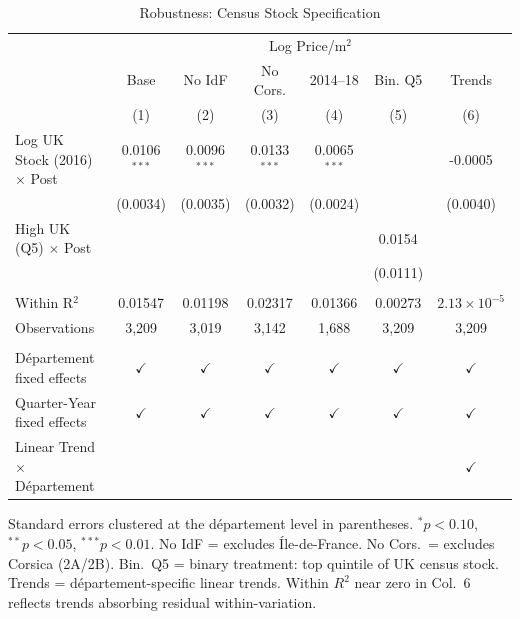 
\begin{table}[htbp]
   \caption{\label{tab:robust} Robustness: Census Stock Specification}
   \bigskip
   \centering
   \begin{tabular}{lcccccc}
      \toprule
       & \multicolumn{6}{c}{Log Price/m$^2$}\\
                                             & Base           & No IdF         & No Cors.       & 2014--18       & Bin. Q5       & Trends \\   
                                             & (1)            & (2)            & (3)            & (4)            & (5)           & (6)\\  
      \midrule 
      Log UK Stock (2016) $\times$ Post      & 0.0106$^{***}$ & 0.0096$^{***}$ & 0.0133$^{***}$ & 0.0065$^{***}$ &               & -0.0005\\   
                                             & (0.0034)       & (0.0035)       & (0.0032)       & (0.0024)       &               & (0.0040)\\   
      High UK (Q5) $\times$ Post             &                &                &                &                & 0.0154        &   \\   
                                             &                &                &                &                & (0.0111)      &   \\   
       \\
      Within R$^2$                           & 0.01547        & 0.01198        & 0.02317        & 0.01366        & 0.00273       & $2.13\times 10^{-5}$\\   
      Observations                           & 3,209          & 3,019          & 3,142          & 1,688          & 3,209         & 3,209\\  
       \\
      D\'epartement fixed effects            & $\checkmark$   & $\checkmark$   & $\checkmark$   & $\checkmark$   & $\checkmark$  & $\checkmark$\\   
      Quarter-Year fixed effects             & $\checkmark$   & $\checkmark$   & $\checkmark$   & $\checkmark$   & $\checkmark$  & $\checkmark$\\   
      Linear Trend $\times $ D\'epartement   &                &                &                &                &               & $\checkmark$\\   
      \bottomrule
   \end{tabular}
\par\vspace{0.3em}\noindent\footnotesize Standard errors clustered at the d\'epartement level in parentheses. $^{*}p<0.10$, $^{**}p<0.05$, $^{***}p<0.01$. No IdF = excludes \'Ile-de-France. No Cors.\ = excludes Corsica (2A/2B). Bin.\ Q5 = binary treatment: top quintile of UK census stock. Trends = d\'epartement-specific linear trends. Within $R^2$ near zero in Col.~6 reflects trends absorbing residual within-variation.
\end{table}


